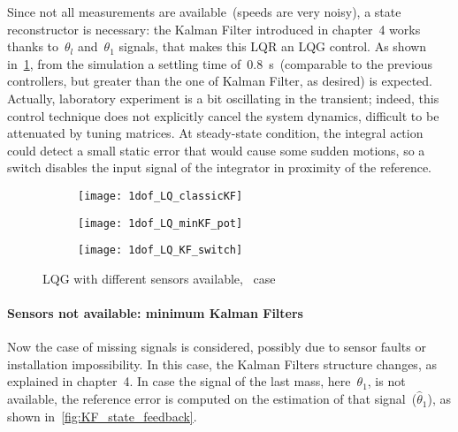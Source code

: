  Since not all measurements are available~(speeds are very noisy), a state reconstructor is necessary: the Kalman Filter introduced in chapter~4 works thanks to~$\theta_l$ and~$\theta_1$ signals, that makes this LQR an LQG control. As shown in~\cref{fig:1dof_LQ_classicKF}, from the simulation a settling time of~0.8~s~(comparable to the previous controllers, but greater than the one of Kalman Filter, as desired) is expected. Actually, laboratory experiment is a bit oscillating in the transient; indeed, this control technique does not explicitly cancel the system dynamics, difficult to be attenuated by tuning matrices. At steady-state condition, the integral action could detect a small static error that would cause some sudden motions, so a switch disables the input signal of the integrator in proximity of the reference.

\begin{figure*}
	\centering
	\begin{subfigure}{0.45\columnwidth}
		\texttt{[image: 1dof\_LQ\_classicKF]}
		\label{fig:1dof_LQ_classicKF}
	\end{subfigure}
	\begin{subfigure}{0.45\columnwidth}
		\texttt{[image: 1dof\_LQ\_minKF\_pot]}
		\label{fig:1dof_LQ_minKF_pot}
	\end{subfigure}
	\newline
	\begin{subfigure}{\columnwidth}
		\centering
		\texttt{[image: 1dof\_LQ\_KF\_switch]}
		\label{fig:1dof_LQ_KF_switch}
	\end{subfigure}
	\caption{LQG with different sensors available, \onedof\ case}
\end{figure*}

\paragraph{Sensors not available: minimum Kalman Filters}

Now the case of missing signals is considered, possibly due to sensor faults or installation impossibility. In this case, the Kalman Filters structure changes, as explained in chapter~4. In case the signal of the last mass, here~$\theta_1$, is not available, the reference error is computed on the estimation of that signal~($\hat\theta_1$), as shown in~\cref{fig:KF_state_feedback}. \\

